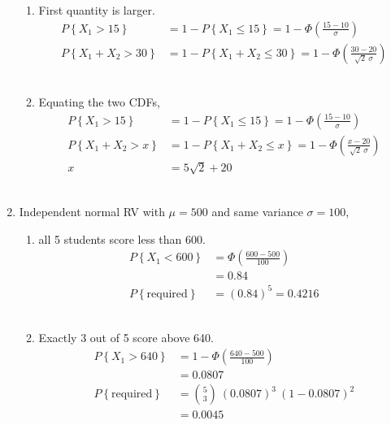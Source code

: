\begin{enumerate}
\begin{enumerate}
			
			\item First quantity is larger.
			\begin{align}
				P \left\{X_1 > 15\right\} &= 1 - P \left\{X_1 \leq 15\right\} = 1 - \Phi\left(\frac{15 - 10}{\sigma}\right) \nonumber \\
				P \left\{X_1 + X_2 > 30\right\} &= 1 - P \left\{X_1 + X_2 \leq 30\right\} = 1 - \Phi\left(\frac{30  -  20}{\sqrt{2}\ \sigma}\right) 
			\end{align}\\
			
			
			\item Equating the two CDFs, \\
			\begin{align}
				P \left\{X_1 > 15\right\} &= 1 - P \left\{X_1 \leq 15\right\} = 1 - \Phi\left(\frac{15 - 10}{\sigma}\right) \nonumber \\
				P \left\{X_1 + X_2 > x\right\} &= 1 - P \left\{X_1 + X_2 \leq x\right\} = 1 - \Phi\left(\frac{x  -  20}{\sqrt{2}\ \sigma}\right) \nonumber \\
				x &= 5\sqrt{2} + 20
			\end{align}\\	
		\end{enumerate}
	
	
	\item Independent normal RV with $ \mu = 500 $ and same variance $ \sigma = 100 $,\\
	
		\begin{enumerate}
			\item all 5 students score less than 600.\\
			\begin{align}
				P \left\{X_1 < 600\right\} &= \Phi\left(\frac{600 - 500}{100}\right) \nonumber \\
				&= 0.84 \nonumber \\
				P\left\{\text{required}\right\} &= (0.84)^5 = 0.4216
			\end{align}\\
			
			
			\item Exactly 3 out of 5 score above 640.
			\begin{align}
				P \left\{X_1 > 640\right\} &= 1 - \Phi\left(\frac{640 - 500}{100}\right) \nonumber \\
				&= 0.0807 \nonumber \\
				P\left\{\text{required}\right\} &= \binom{5}{3}\ (0.0807)^3\ (1- 0.0807)^2 \nonumber \\
				&= 0.0045
			\end{align}\\
			

\end{enumerate}
\end{enumerate}
